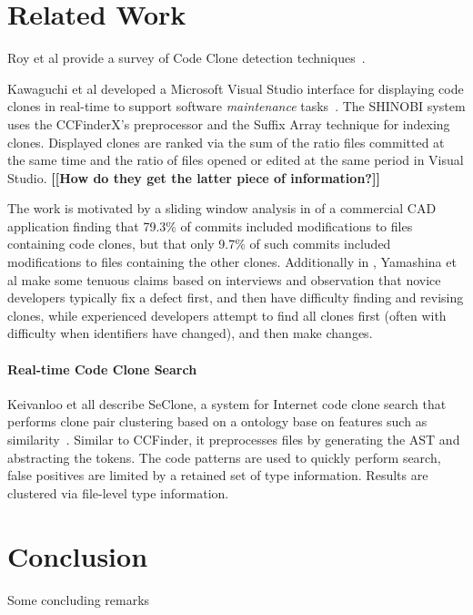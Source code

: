 \documentclass[preprint,10pt]{sigplanconf}
\newcommand{\todo}[1]{{\bfseries [[#1]]}}
\begin{document}
\section{Related Work}

Roy et al provide a survey of Code Clone detection
techniques~\cite{Roy2009}.

Kawaguchi et al developed a Microsoft Visual Studio interface for
displaying code clones in real-time to support software
\emph{maintenance} tasks~\cite{Kawaguchi2009,Yamashina2008}. The
SHINOBI system uses the CCFinderX's preprocessor and the Suffix Array
technique for indexing clones. Displayed clones are ranked via the sum
of the ratio files committed at the same time and the ratio of files
opened or edited at the same period in Visual Studio. \todo{How do
  they get the latter piece of information?}

The work is motivated by a sliding window analysis in
\cite{Yamashina2008} of a commercial CAD application finding that
79.3\% of commits included modifications to files containing code
clones, but that only 9.7\% of such commits included modifications to
files containing the other clones. Additionally in
\cite{Yamashina2008}, Yamashina et al make some tenuous claims based
on interviews and observation that novice developers typically fix a
defect first, and then have difficulty finding and revising clones,
while experienced developers attempt to find all clones first (often
with difficulty when identifiers have changed), and then make changes.

\paragraph{Real-time Code Clone Search}

Keivanloo et all describe SeClone, a system for Internet code clone
search that performs clone pair clustering based on a ontology base on
features such as similarity~\cite{Keivanloo2011}. Similar to CCFinder,
it preprocesses files by generating the AST and abstracting the
tokens. The code patterns are used to quickly perform search, false
positives are limited by a retained set of type information. Results
are clustered via file-level type information.




\section{Conclusion}

Some concluding remarks

%

%
%
\end{document}
